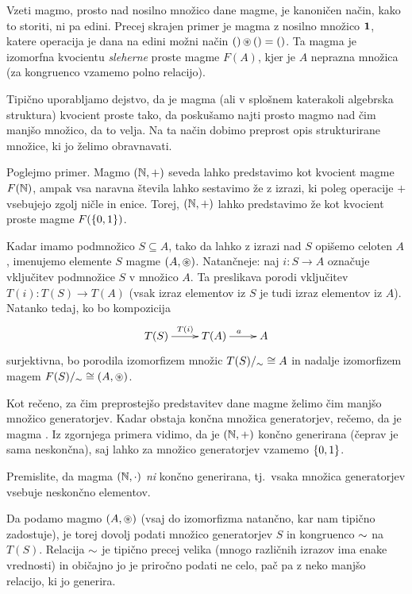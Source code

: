 Vzeti magmo, prosto nad nosilno množico dane magme, je kanoničen način, kako to storiti, ni pa edini. Precej skrajen primer je magma z nosilno množico $\mathtt{\mathbf{1}}$, katere operacija je dana na edini možni način $\mathord{()} \mathop{\circledast}\nolimits \mathord{()} = \mathord{()}$. Ta magma je izomorfna kvocientu \emph{sleherne} proste magme $F(A)$, kjer je $A$ neprazna množica (za kongruenco vzamemo polno relacijo).

Tipično uporabljamo dejstvo, da je magma (ali v splošnem katerakoli algebrska struktura) kvocient proste tako, da poskušamo najti prosto magmo nad čim manjšo množico, da to velja. Na ta način dobimo preprost opis strukturirane množice, ki jo želimo obravnavati.

Poglejmo primer. Magmo $(\mathbb{N}, +)$ seveda lahko predstavimo kot kvocient magme $F(\mathbb{N})$, ampak vsa naravna števila lahko sestavimo že z izrazi, ki poleg operacije $+$ vsebujejo zgolj ničle in enice. Torej, $(\mathbb{N}, +)$ lahko predstavimo že kot kvocient proste magme $F(\set{0, 1})$. 

Kadar imamo podmnožico $S \subseteq A$, tako da lahko z izrazi nad $S$ opišemo celoten $A$, imenujemo elemente $S$  magme $(A, \mathop{\circledast}\nolimits)$. Natančneje: naj $i\colon S \to A$ označuje vključitev podmnožice $S$ v množico $A$. Ta preslikava porodi vključitev $T(i)\colon T(S) \to T(A)$ (vsak izraz elementov iz $S$ je tudi izraz elementov iz $A$). Natanko tedaj, ko bo kompozicija
\[\xymatrix{
T(S) \ar[r]^{T(i)} & T(A) \ar[r]^a & A
}\]
surjektivna, bo porodila izomorfizem množic $T(S)/_\sim \cong A$ in nadalje izomorfizem magem $F(S)/_\sim \cong (A, \mathop{\circledast}\nolimits)$.

Kot rečeno, za čim preprostejšo predstavitev dane magme želimo čim manjšo množico generatorjev. Kadar obstaja končna množica generatorjev, rečemo, da je magma . Iz zgornjega primera vidimo, da je $(\mathbb{N}, +)$ končno generirana (čeprav je sama neskončna), saj lahko za množico generatorjev vzamemo $\set{0, 1}$.

\begin{naloga}
Premislite, da magma $(\mathbb{N}, \cdot)$ \emph{ni} končno generirana, tj.~vsaka množica generatorjev vsebuje neskončno elementov.
\end{naloga}

Da podamo magmo $(A, \mathop{\circledast}\nolimits)$ (vsaj do izomorfizma natančno, kar nam tipično zadostuje), je torej dovolj podati množico generatorjev $S$ in kongruenco $\sim$ na $T(S)$. Relacija $\sim$ je tipično precej velika (mnogo različnih izrazov ima enake vrednosti) in običajno jo je priročno podati ne celo, pač pa z neko manjšo relacijo, ki jo generira.


